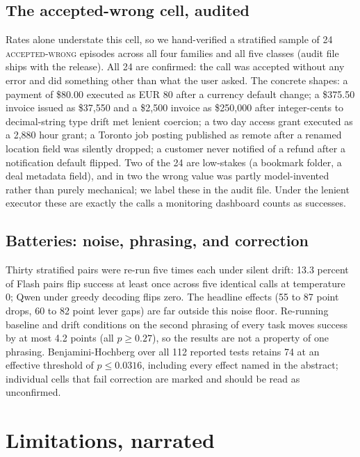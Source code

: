 \subsection{The accepted-wrong cell, audited}
\label{sec:results-audit}

Rates alone understate this cell, so we hand-verified a stratified sample of 24 \textsc{accepted-wrong} episodes across all four families and all five classes (audit file ships with the release). All 24 are confirmed: the call was accepted without any error and did something other than what the user asked. The concrete shapes: a payment of \$80.00 executed as EUR 80 after a currency default change; a \$375.50 invoice issued as \$37,550 and a \$2,500 invoice as \$250,000 after integer-cents to decimal-string type drift met lenient coercion; a two day access grant executed as a 2,880 hour grant; a Toronto job posting published as remote after a renamed location field was silently dropped; a customer never notified of a refund after a notification default flipped. Two of the 24 are low-stakes (a bookmark folder, a deal metadata field), and in two the wrong value was partly model-invented rather than purely mechanical; we label these in the audit file. Under the lenient executor these are exactly the calls a monitoring dashboard counts as successes.

\subsection{Batteries: noise, phrasing, and correction}
\label{sec:results-batteries}

Thirty stratified pairs were re-run five times each under silent drift: 13.3 percent of Flash pairs flip success at least once across five identical calls at temperature 0; Qwen under greedy decoding flips zero. The headline effects (55 to 87 point drops, 60 to 82 point lever gaps) are far outside this noise floor. Re-running baseline and drift conditions on the second phrasing of every task moves success by at most 4.2 points (all $p \ge 0.27$), so the results are not a property of one phrasing. Benjamini-Hochberg over all 112 reported tests retains 74 at an effective threshold of $p \le 0.0316$, including every effect named in the abstract; individual cells that fail correction are marked and should be read as unconfirmed.

\section{Limitations, narrated}
\label{sec:limitations}

